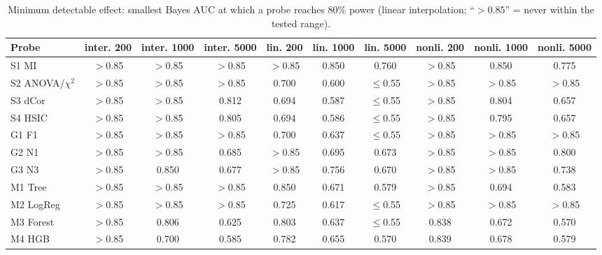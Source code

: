 \begin{table}[!t]
\centering
\caption{Minimum detectable effect: smallest Bayes AUC at which a probe reaches 80\% power (linear interpolation; ``$>0.85$'' = never within the tested range).}
\label{tab:mde}
\footnotesize
\begin{adjustbox}{max width=\linewidth}
\begin{tabular}{lccccccccc}
\hline
Probe & inter. 200 & inter. 1000 & inter. 5000 & lin. 200 & lin. 1000 & lin. 5000 & nonli. 200 & nonli. 1000 & nonli. 5000 \\ \hline
S1 MI & $>$0.85 & $>$0.85 & $>$0.85 & $>$0.85 & 0.850 & 0.760 & $>$0.85 & 0.850 & 0.775 \\
S2 ANOVA/$\chi^2$ & $>$0.85 & $>$0.85 & $>$0.85 & 0.700 & 0.600 & $\le$0.55 & $>$0.85 & $>$0.85 & $>$0.85 \\
S3 dCor & $>$0.85 & $>$0.85 & 0.812 & 0.694 & 0.587 & $\le$0.55 & $>$0.85 & 0.804 & 0.657 \\
S4 HSIC & $>$0.85 & $>$0.85 & 0.805 & 0.694 & 0.586 & $\le$0.55 & $>$0.85 & 0.795 & 0.657 \\
G1 F1 & $>$0.85 & $>$0.85 & $>$0.85 & 0.700 & 0.637 & $\le$0.55 & $>$0.85 & $>$0.85 & $>$0.85 \\
G2 N1 & $>$0.85 & $>$0.85 & 0.685 & $>$0.85 & 0.695 & 0.673 & $>$0.85 & $>$0.85 & 0.800 \\
G3 N3 & $>$0.85 & 0.850 & 0.677 & $>$0.85 & 0.756 & 0.670 & $>$0.85 & $>$0.85 & 0.738 \\
M1 Tree & $>$0.85 & $>$0.85 & $>$0.85 & 0.850 & 0.671 & 0.579 & $>$0.85 & 0.694 & 0.583 \\
M2 LogReg & $>$0.85 & $>$0.85 & $>$0.85 & 0.725 & 0.617 & $\le$0.55 & $>$0.85 & $>$0.85 & $>$0.85 \\
M3 Forest & $>$0.85 & 0.806 & 0.625 & 0.803 & 0.637 & $\le$0.55 & 0.838 & 0.672 & 0.570 \\
M4 HGB & $>$0.85 & 0.700 & 0.585 & 0.782 & 0.655 & 0.570 & 0.839 & 0.678 & 0.579 \\
\hline
\end{tabular}
\end{adjustbox}
\end{table}

